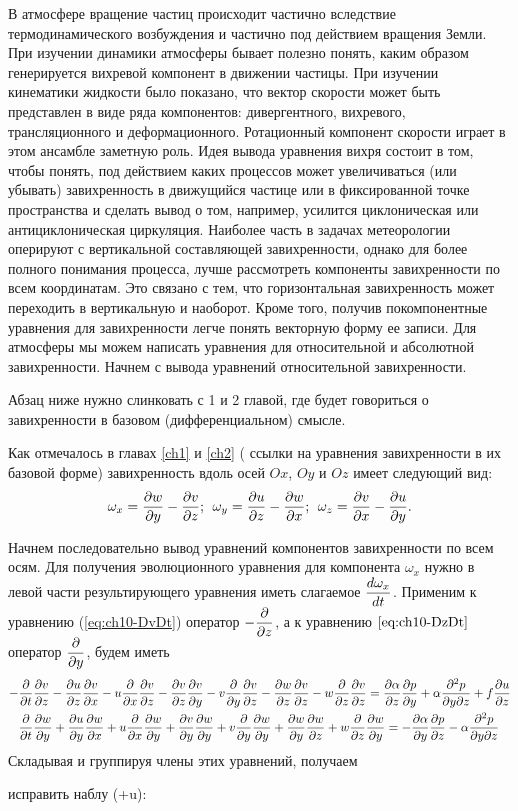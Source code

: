 В атмосфере вращение частиц происходит частично вследствие термодинамического возбуждения и частично под действием вращения Земли. При изучении динамики атмосферы бывает полезно понять, каким образом генерируется вихревой компонент в движении частицы. При изучении кинематики жидкости было показано, что вектор скорости может быть представлен в виде ряда компонентов: дивергентного, вихревого, трансляционного и деформационного. Ротационный компонент скорости играет в этом ансамбле заметную роль. Идея вывода уравнения вихря состоит в том, чтобы понять, под действием каких процессов может увеличиваться (или убывать) завихренность в движущийся частице или в фиксированной точке пространства и сделать вывод о том, например, усилится циклоническая или антициклоническая циркуляция. Наиболее часть в задачах метеорологии оперируют с вертикальной составляющей завихренности, однако для более полного понимания процесса, лучше рассмотреть компоненты завихренности по всем координатам. Это связано с тем, что горизонтальная завихренность может переходить в вертикальную и наоборот. Кроме того, получив покомпонентные уравнения для завихренности легче понять векторную форму ее записи. Для атмосферы мы можем написать уравнения для относительной и абсолютной завихренности. Начнем с вывода уравнений относительной завихренности.

\begin{warn}
    Абзац ниже нужно слинковать с 1 и 2 главой, где будет говориться о завихренности в базовом (дифференциальном) смысле.
\end{warn}

Как отмечалось в главах \ref{ch1} и \ref{ch2} ({\color{red} ссылки на уравнения завихренности в их базовой форме}) завихренность вдоль осей $Ox$, $Oy$ и $Oz$ имеет следующий вид:
\begin{equation}
    \omega_x = \displaystyle\frac{\partial w}{\partial y}-\displaystyle\frac{\partial v}{\partial z}; \:\: \omega_y = \displaystyle\frac{\partial u}{\partial z}-\displaystyle\frac{\partial w}{\partial x}; \:\:\omega_z = \displaystyle\frac{\partial v}{\partial x}-\displaystyle\frac{\partial u}{\partial y}.
\end{equation}

Начнем последовательно вывод уравнений компонентов завихренности по всем осям. Для получения эволюционного уравнения для компонента $\omega_x$ нужно в левой части результирующего уравнения иметь слагаемое $\displaystyle\frac{d \omega_x}{d t}$. Применим к уравнению (\ref{eq:ch10-DvDt}) оператор $-\displaystyle\frac{\partial }{\partial z}$, а к уравнению $\ref{eq:ch10-DzDt}$ оператор $\displaystyle\frac{\partial }{\partial y}$, будем иметь
\begin{align*}
    -&\displaystyle\frac{\partial }{\partial t}\displaystyle\frac{\partial v}{\partial z}-\displaystyle\frac{\partial u}{\partial z}\displaystyle\frac{\partial v}{\partial x}-u\displaystyle\frac{\partial }{\partial x}\displaystyle\frac{\partial v}{\partial z}-\displaystyle\frac{\partial v}{\partial z}\displaystyle\frac{\partial v}{\partial y} - 
    v\displaystyle\frac{\partial }{\partial y}\displaystyle\frac{\partial v}{\partial z}-\displaystyle\frac{\partial w}{\partial z}\displaystyle\frac{\partial v}{\partial z}-w\displaystyle\frac{\partial }{\partial z}\displaystyle\frac{\partial v}{\partial z} = 
    \displaystyle\frac{\partial \alpha}{\partial z}\displaystyle\frac{\partial p}{\partial y}+\alpha\frac{\partial^2p}{\partial y \partial z} + f\displaystyle\frac{\partial u}{\partial z} \\
    &\displaystyle\frac{\partial }{\partial t}\displaystyle\frac{\partial w}{\partial y}+\displaystyle\frac{\partial u}{\partial y}\displaystyle\frac{\partial w}{\partial x}+u\displaystyle\frac{\partial }{\partial x}\displaystyle\frac{\partial w}{\partial y}+\displaystyle\frac{\partial v}{\partial y}\displaystyle\frac{\partial w}{\partial y} +
    v\displaystyle\frac{\partial }{\partial y}\displaystyle\frac{\partial w}{\partial y}+\displaystyle\frac{\partial w}{\partial y}\displaystyle\frac{\partial w}{\partial z}+w\displaystyle\frac{\partial }{\partial z}\displaystyle\frac{\partial w}{\partial y} = 
    -\displaystyle\frac{\partial \alpha}{\partial y}\displaystyle\frac{\partial p}{\partial z}-\alpha\frac{\partial^2p}{\partial y \partial z} 
\end{align*}
Складывая и группируя члены этих уравнений, получаем
\begin{warn}
    исправить наблу (+u):
\end{warn}

